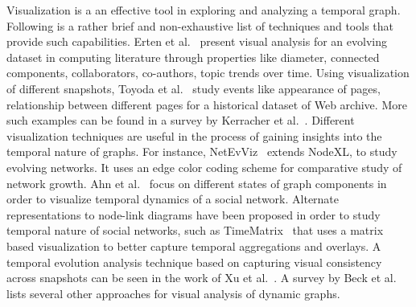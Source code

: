 \documentclass{svjour3}
\begin{document}
Visualization is a an effective tool in exploring and analyzing a temporal graph. Following is a rather brief and non-exhaustive list of techniques and tools that provide such capabilities. 
Erten et al.~\cite{erten2004exploring} present visual analysis for an evolving dataset in computing literature through properties like diameter, connected components, collaborators, co-authors, topic trends over time.
Using visualization of different snapshots, Toyoda et al.~\cite{toyoda2005system} study events like appearance of pages, relationship between different pages for a historical dataset of Web archive.
More such examples can be found in a survey by Kerracher et al.~\cite{kerracher2015task}. Different visualization techniques are useful in the process of gaining insights into the temporal nature of graphs. For instance, NetEvViz~\cite{khurana2011visual} extends NodeXL, to study evolving networks. It uses an edge color coding scheme for comparative study of network growth. Ahn et al.~\cite{ahn2011temporal} focus on different states of graph components in order to visualize temporal dynamics of a social network.
Alternate representations to node-link diagrams have been proposed in order to study temporal nature of social networks, such as TimeMatrix~\cite{yi2010timematrix} that uses a matrix based visualization to better capture temporal aggregations and overlays. A temporal evolution analysis technique based on capturing visual consistency across snapshots can be seen in the work of Xu et al.~\cite{xu2011visualizing}.
A survey by Beck et al.~\cite{beck2014state} lists several other approaches for visual analysis of dynamic graphs. 





\end{document}

